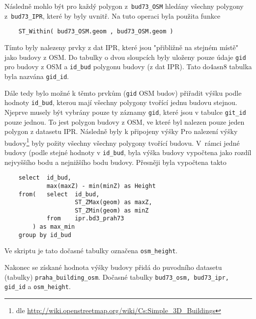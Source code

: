 Následně mohlo být pro každý polygon z~{\tt bud73\_OSM} hledány
všechny polygony z~{\tt bud73\_IPR}, které by byly uvnitř.
Na tuto operaci byla použita funkce
\begin{verbatim}
    ST_Within( bud73_OSM.geom , bud73_OSM.geom )
\end{verbatim}
Tímto byly nalezeny prvky z dat IPR, které jsou "přibližně na stejném místě"
jako budovy z OSM. Do tabulky o dvou sloupcích byly uloženy pouze údaje
{\tt gid} pro budovy z OSM a {\tt id_bud} polygonu budovy (z dat IPR).
Tato do4asn8 tabulka byla nazvána {\tt gid_id}.


Dále tedy bylo možné k těmto prvkům ({\tt gid} OSM budov) přiřadit výšku podle hodnoty {\tt id\_bud},
kterou mají všechny polygony tvořící jednu budovu stejnou.
Njeprve musely být vybrány pouze ty záznamy {\tt gid},
které jsou v tabulce {\tt git_id} pouze jednou.
To jest polygon budovy z OSM, ve které byl nalezen pouze jeden polygon z datasetu IPR.
Následně byly k připojeny výšky
Pro nalezení výšky budovy\footnote{dle \url{http://wiki.openstreetmap.org/wiki/Cs:Simple_3D_Buildings}}
byly požity všechny všechny polygony tvořící budovu.
V~rámci jedné budovy (podle stejné hodnoty v {\tt id_bud}, byla výška budovy vypočtena
jako rozdíl nejvyššího bodu a nejnižšího bodu budovy.
Přesněji byla vypočtena takto
\begin{verbatim}
    select	id_bud,
            max(maxZ) - min(minZ) as Height
    from(   select	id_bud,
                    ST_ZMax(geom) as maxZ,
                    ST_ZMin(geom) as minZ
            from    ipr.bd3_prah73
        ) as max_min
    group by id_bud
\end{verbatim}
Ve skriptu je tato dočasné tabulky označena {\tt osm_height}.

Nakonec se získané hodnota výšky budovy přidá do puvodního datasetu (tabulky)
{\tt praha_building_osm}. Dočasné tabulky {\tt bud73\_osm, bud73\_ipr, gid\_id}
a {\tt osm_height}.






